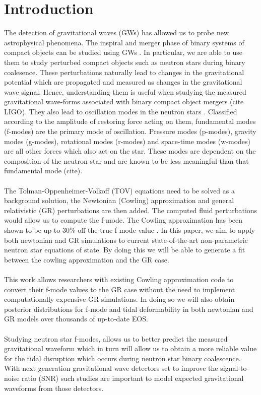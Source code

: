 \documentclass[aps,prd,twocolumn,superscriptaddress,footinbib]{revtex4-1}
\begin{document}
\section{Introduction}
The detection of gravitational waves (GWs) has allowed us to probe new astrophysical phenomena. The inspiral and merger phase of binary systems of compact objects can be studied using GWs \cite{lindblom1983quadrupole, 1205}.  In particular, we are able to use them to study perturbed compact objects such as neutron stars during binary coalesence. These perturbations naturally lead to changes in the gravitational potential which are propagated and measured as changes in the gravitational wave signal. Hence, understanding them is useful when studying the measured gravitational wave-forms associated with binary compact object mergers (cite LIGO). They also lead to oscillation modes in the neutron stars \cite{1983}. Classified according to the amplitude of restoring force \cite{1205} acting on them, fundamental modes (f-modes) are the primary mode of oscillation. Pressure modes (p-modes),  gravity modes (g-modes), rotational modes (r-modes) and space-time modes (w-modes) are all other forces which also act on the star. These modes are dependent on the composition of the neutron star and are known to be less meaningful than that fundamental mode (cite).  \\ \\The Tolman-Oppenheimer-Volkoff (TOV) equations need to be solved as a background solution, the Newtonian (Cowling) approximation and general relativistic (GR) perturbations are then added. The computed fluid perturbations would allow us to compute the f-mode. The Cowling approximation has been shown to be up to 30\% off the true f-mode value \cite{bharat}.  In this paper, we aim to apply both newtonian and GR simulations to current state-of-the-art non-parametric neutron star equations of state. By doing this we will be able to generate a fit between the cowling approximation and the GR case. \\ \\This work allows researchers with existing Cowling approximation code to convert their f-mode values to the GR case without the need to implement computationally expensive GR simulations. In doing so we will also obtain posterior distributions for f-mode and tidal deformability in both newtonian and GR models over thousands of up-to-date EOS. \\ \\ Studying neutron star f-modes, allows us to better predict the measured gravitational waveform which in turn will allow us to obtain a more reliable value for the tidal disruption which occurs during neutron star binary coalescence. With next generation gravitational wave detectors set to improve the signal-to-noise ratio (SNR) such studies are important to model expected gravitational waveforms from those detectors. 
\end{document}
